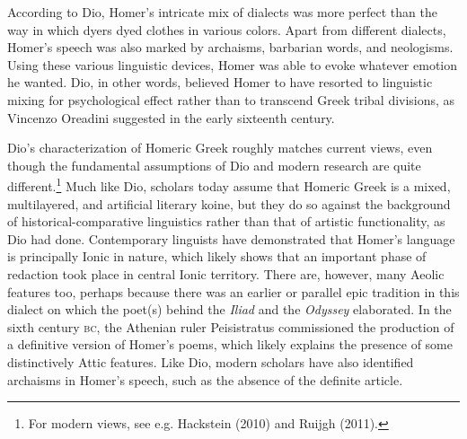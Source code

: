 \begin{styleQuote}
$\kappa \alpha \text{\textgreek{`i}}$ $\sigma \upsilon \rho \text{\textgreek{'i}}\gamma \gamma \omega \nu $ […]. $\text{\textgreek{<u}}\varphi \text{\textgreek{>}}$ $\text{\textgreek{<~h}}\varsigma $ $\text{\textgreek{>e}}\pi o\pi o\iota \text{\textgreek{'i}}\alpha \varsigma $ $\delta \upsilon \nu \alpha \tau \text{\textgreek{`o}}\varsigma $ $\text{\textgreek{>~h}}\nu $ $\text{\textgreek{<o}}\pi o\text{\textgreek{~i}}o\nu $ $\text{\textgreek{>e}}\beta o\text{\textgreek{'u}}\lambda \varepsilon \tau o$ $\text{\textgreek{>e}}\mu \pi o\iota \text{\textgreek{~h}}\sigma \alpha \iota $ $\tau \text{\textgreek{~h|}}$ $\psi \upsilon \chi \text{\textgreek{~h|}}$ $\pi \text{\textgreek{'a}}\theta o\varsigma $”. The English translation is taken over from the Loeb series.}
\end{styleQuote}

\begin{styleStandard}
According to Dio, Homer’s intricate mix of dialects was more perfect than the way in which dyers dyed clothes in various colors. Apart from different dialects, Homer’s speech was also marked by archaisms, barbarian words, and neologisms. Using these various linguistic devices, Homer was able to evoke whatever emotion he wanted. Dio, in other words, believed Homer to have resorted to linguistic mixing for psychological effect rather than to transcend Greek tribal divisions, as Vincenzo Oreadini suggested in the early sixteenth century.
\end{styleStandard}

\begin{styleStandard}
Dio’s characterization of Homeric Greek roughly matches current views, even though the fundamental assumptions of Dio and modern research are quite different.\footnote{ For modern views, see e.g. Hackstein (2010) and Ruijgh (2011).} Much like Dio, scholars today assume that Homeric Greek is a mixed, multilayered, and artificial literary koine, but they do so against the background of historical-comparative linguistics rather than that of artistic functionality, as Dio had done. Contemporary linguists have demonstrated that Homer’s language is principally Ionic in nature, which likely shows that an important phase of redaction took place in central Ionic territory. There are, however, many Aeolic features too, perhaps because there was an earlier or parallel epic tradition in this dialect on which the poet(s) behind the \textit{Iliad} and the \textit{Odyssey} elaborated. In the sixth century \textsc{bc}, the Athenian ruler Peisistratus commissioned the production of a definitive version of Homer’s poems, which likely explains the presence of some distinctively Attic features. Like Dio, modern scholars have also identified archaisms in Homer’s speech, such as the absence of the definite article.
\end{styleStandard}

